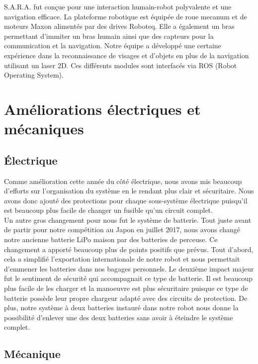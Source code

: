\documentclass[runningheads,a4paper]{llncs}
\begin{document}
S.A.R.A. fut conçue pour une interaction humain-robot polyvalente et une navigation efficace. La plateforme robotique est équipée de roue mecanum et de moteurs Maxon alimentés par des drives Roboteq. Elle a également un bras permettant d'immiter un bras humain ainsi que des capteurs pour la communication et la navigation. Notre équipe a développé une certaine expérience dans la reconnaissance de visages et d'objets en plus de la navigation utilisant un laser 2D. Ces différents modules sont interfacés via ROS (Robot Operating System). \\

\section{Améliorations électriques et mécaniques}
\subsection{Électrique}

Comme amélioration cette année du côté électrique, nous avons mis beaucoup d'efforts sur l'organisation du système en le rendant plus clair et sécuritaire. Nous avons donc ajouté des protections pour chaque sous-système électrique puisqu'il est beaucoup plus facile de changer un fusible qu'un circuit complet. \\

Un autre gros changement pour nous fut le système de batterie. Tout juste avant de partir pour notre compétition au Japon en juillet 2017, nous avons changé notre ancienne batterie LiPo maison par des batteries de perceuse. Ce changement a apporté beaucoup plus de points positifs que prévus. Tout d'abord, cela a simplifié l'exportation internationale de notre robot et nous permettait d'emmener les batteries dans nos bagages personnels. Le deuxième impact majeur fut le sentiment de sécurité qui accompagnait ce type de batterie. Il est beaucoup plus facile de les charger et la manoeuvre est plus sécuritaire puisque ce type de batterie possède leur propre chargeur adapté avec des circuits de protection. De plus, notre système à deux batteries instauré dans notre robot nous donne la possibilité d'enlever une des deux batteries sans avoir à éteindre le système complet.\\



\subsection{Mécanique}
\end{document}
